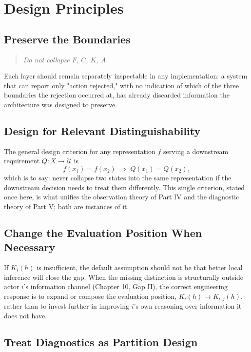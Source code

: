 \documentclass[11pt]{report}
\theoremstyle{definition}
\theoremstyle{plain}
\newcommand{\Uni}{\mathcal{U}}
\begin{document}
\part{Design Principles}

\chapter{Preserve the Boundaries}

\begin{quote}
\emph{Do not collapse $F$, $C$, $K$, $A$.}
\end{quote}
Each layer should remain separately inspectable in any implementation: a system that can report only "action rejected," with no indication of which of the three boundaries the rejection occurred at, has already discarded information the architecture was designed to preserve.

\chapter{Design for Relevant Distinguishability}

The general design criterion for any representation $f$ serving a downstream requirement $Q: X \to \Uni$ is
\[
f(x_1) = f(x_2) \;\Rightarrow\; Q(x_1) = Q(x_2),
\]
which is to say: never collapse two states into the same representation if the downstream decision needs to treat them differently. This single criterion, stated once here, is what unifies the observation theory of Part IV and the diagnostic theory of Part V; both are instances of it.

\chapter{Change the Evaluation Position When Necessary}

If $K_i(h)$ is insufficient, the default assumption should not be that better local inference will close the gap. When the missing distinction is structurally outside actor $i$'s information channel (Chapter 10, Gap II), the correct engineering response is to expand or compose the evaluation position, $K_i(h) \to K_{i,j}(h)$, rather than to invest further in improving $i$'s own reasoning over information it does not have.

\chapter{Treat Diagnostics as Partition Design}
\end{document}
